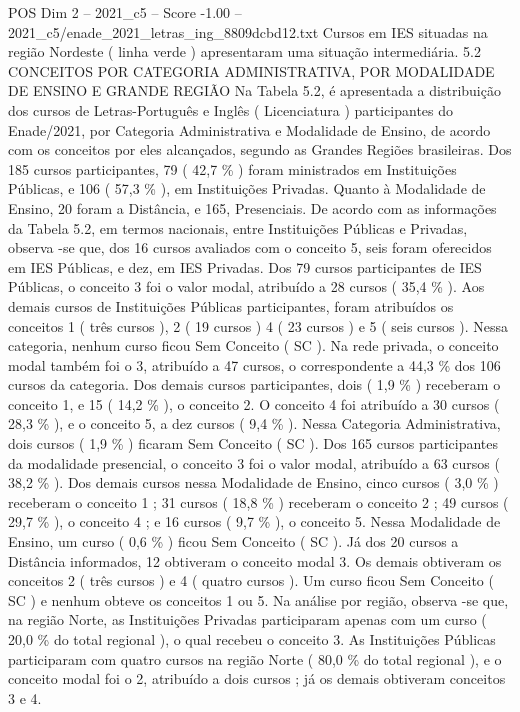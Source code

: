 \begin{textsample}{POS Dim 2 – 2021\_c5 – Score -1.00 – 2021\_c5/enade\_2021\_letras\_ing\_8809dcbd12.txt}
Cursos em IES situadas na região Nordeste ( linha verde ) apresentaram uma situação intermediária. 5.2 CONCEITOS POR CATEGORIA ADMINISTRATIVA, POR MODALIDADE DE ENSINO E GRANDE REGIÃO Na Tabela 5.2, é apresentada a distribuição dos cursos de Letras-Português e Inglês ( Licenciatura ) participantes do Enade/2021, por Categoria Administrativa e Modalidade de Ensino, de acordo com os conceitos por eles alcançados, segundo as Grandes Regiões brasileiras.
Dos 185 cursos participantes, 79 ( 42,7 \% ) foram ministrados em Instituições Públicas, e 106 ( 57,3 \% ), em Instituições Privadas.
Quanto à Modalidade de Ensino, 20 foram a Distância, e 165, Presenciais.
De acordo com as informações da Tabela 5.2, em termos nacionais, entre Instituições Públicas e Privadas, observa -se que, dos 16 cursos avaliados com o conceito 5, seis foram oferecidos em IES Públicas, e dez, em IES Privadas.
Dos 79 cursos participantes de IES Públicas, o conceito 3 foi o valor modal, atribuído a 28 cursos ( 35,4 \% ).
Aos demais cursos de Instituições Públicas participantes, foram atribuídos os conceitos 1 ( três cursos ), 2 ( 19 cursos ) 4 ( 23 cursos ) e 5 ( seis cursos ).
Nessa categoria, nenhum curso ficou Sem Conceito ( SC ).
Na rede privada, o conceito modal também foi o 3, atribuído a 47 cursos, o correspondente a 44,3 \% dos 106 cursos da categoria.
Dos demais cursos participantes, dois ( 1,9 \% ) receberam o conceito 1, e 15 ( 14,2 \% ), o conceito 2.
O conceito 4 foi atribuído a 30 cursos ( 28,3 \% ), e o conceito 5, a dez cursos ( 9,4 \% ).
Nessa Categoria Administrativa, dois cursos ( 1,9 \% ) ficaram Sem Conceito ( SC ).
Dos 165 cursos participantes da modalidade presencial, o conceito 3 foi o valor modal, atribuído a 63 cursos ( 38,2 \% ).
Dos demais cursos nessa Modalidade de Ensino, cinco cursos ( 3,0 \% ) receberam o conceito 1 ; 31 cursos ( 18,8 \% ) receberam o conceito 2 ; 49 cursos ( 29,7 \% ), o conceito 4 ; e 16 cursos ( 9,7 \% ), o conceito 5.
Nessa Modalidade de Ensino, um curso ( 0,6 \% ) ficou Sem Conceito ( SC ).
Já dos 20 cursos a Distância informados, 12 obtiveram o conceito modal 3.
Os demais obtiveram os conceitos 2 ( três cursos ) e 4 ( quatro cursos ).
Um curso ficou Sem Conceito ( SC ) e nenhum obteve os conceitos 1 ou 5.
Na análise por região, observa -se que, na região Norte, as Instituições Privadas participaram apenas com um curso ( 20,0 \% do total regional ), o qual recebeu o conceito 3.
As Instituições Públicas participaram com quatro cursos na região Norte ( 80,0 \% do total regional ), e o conceito modal foi o 2, atribuído a dois cursos ; já os demais obtiveram conceitos 3 e 4.

\end{textsample}
